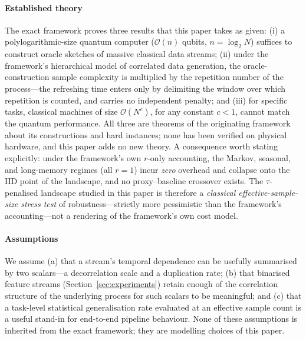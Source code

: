 \documentclass[sensors,article,submit,pdftex,moreauthors]{Definitions/mdpi}
\newcommand{\bigO}{\mathcal{O}}
\begin{document}
\paragraph{Established theory} The exact framework \citep{zhao2026exponential} proves three results that this paper takes as given: (i) a polylogarithmic-size quantum computer ($\bigO(n)$ qubits, $n = \log_2 N$) suffices to construct oracle sketches of massive classical data streams; (ii) under the framework's hierarchical model of correlated data generation, the oracle-construction sample complexity is multiplied by the repetition number of the process---the refreshing time enters only by delimiting the window over which repetition is counted, and carries no independent penalty; and (iii) for specific tasks, classical machines of size $\bigO(N^{c})$, for any constant $c < 1$, cannot match the quantum performance. All three are theorems of the originating framework about its constructions and hard instances; none has been verified on physical hardware, and this paper adds no new theory. A consequence worth stating explicitly: under the framework's own $r$-only accounting, the Markov, seasonal, and long-memory regimes (all $r = 1$) incur \emph{zero} overhead and collapse onto the IID point of the landscape, and no proxy--baseline crossover exists. The $\tau$-penalised landscape studied in this paper is therefore a \emph{classical effective-sample-size stress test} of robustness---strictly more pessimistic than the framework's accounting---not a rendering of the framework's own cost model.

\paragraph{Assumptions} We assume (a) that a stream's temporal dependence can be usefully summarised by two scalars---a decorrelation scale and a duplication rate; (b) that binarised feature streams (Section~\ref{sec:experiments}) retain enough of the correlation structure of the underlying process for such scalars to be meaningful; and (c) that a task-level statistical generalisation rate evaluated at an effective sample count is a useful stand-in for end-to-end pipeline behaviour. None of these assumptions is inherited from the exact framework; they are modelling choices of this paper.
\end{document}
